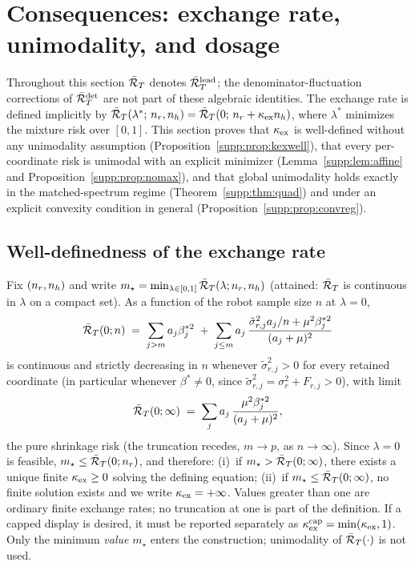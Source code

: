\section{Consequences: exchange rate, unimodality, and dosage}
\label{supp:t2}

Throughout this section $\bar{\mathcal{R}}_T$ denotes $\bar{\mathcal{R}}_T^{\mathrm{lead}}$; the denominator-fluctuation corrections of $\bar{\mathcal{R}}_T^{\det}$ are not part of these algebraic identities.
The exchange rate is defined implicitly by $\bar{\mathcal{R}}_T(\lambda^*;\, n_r, n_h) = \bar{\mathcal{R}}_T(0;\, n_r + \kappa_{\mathrm{ex}}n_h)$, where $\lambda^*$ minimizes the mixture risk over $[0,1]$.
This section proves that $\kappa_{\mathrm{ex}}$ is well-defined without any unimodality assumption (Proposition~\ref{supp:prop:kexwell}), that every per-coordinate risk is unimodal with an explicit minimizer (Lemma~\ref{supp:lem:affine} and Proposition~\ref{supp:prop:nomax}), and that global unimodality holds exactly in the matched-spectrum regime (Theorem~\ref{supp:thm:quad}) and under an explicit convexity condition in general (Proposition~\ref{supp:prop:convreg}).

\subsection{Well-definedness of the exchange rate}

\begin{proposition}\label{supp:prop:kexwell}
Fix $(n_r,n_h)$ and write $m_\star = \min_{\lambda \in [0,1]} \bar{\mathcal{R}}_T(\lambda; n_r, n_h)$ (attained: $\bar{\mathcal{R}}_T$ is continuous in $\lambda$ on a compact set).
As a function of the robot sample size $n$ at $\lambda = 0$,
\begin{equation}
\bar{\mathcal{R}}_T(0; n) \;=\; \sum_{j > m} a_j \beta_j^{*2} \;+\; \sum_{j \le m} a_j\, \frac{\tilde\sigma_{r,j}^2 a_j / n + \mu^2 \beta_j^{*2}}{(a_j + \mu)^2}
\end{equation}
is continuous and strictly decreasing in $n$ whenever $\tilde\sigma_{r,j}^2 > 0$ for every retained coordinate (in particular whenever $\beta^* \neq 0$, since $\tilde\sigma_{r,j}^2 = \sigma_r^2 + F_{r,j} > 0$), with limit
\begin{equation}
\bar{\mathcal{R}}_T(0; \infty) \;=\; \sum_{j} a_j\, \frac{\mu^2 \beta_j^{*2}}{(a_j + \mu)^2},
\end{equation}
the pure shrinkage risk (the truncation recedes, $m \to p$, as $n \to \infty$).
Since $\lambda = 0$ is feasible, $m_\star \le \bar{\mathcal{R}}_T(0; n_r)$, and therefore:
(i)~if $m_\star > \bar{\mathcal{R}}_T(0; \infty)$, there exists a unique finite $\kappa_{\mathrm{ex}} \ge 0$ solving the defining equation;
(ii)~if $m_\star \le \bar{\mathcal{R}}_T(0; \infty)$, no finite solution exists and we write $\kappa_{\mathrm{ex}} = +\infty$.
Values greater than one are ordinary finite exchange rates; no truncation at one is part of the definition.
If a capped display is desired, it must be reported separately as $\kappa_{\mathrm{ex}}^{\mathrm{cap}}=\min(\kappa_{\mathrm{ex}},1)$.
Only the minimum \emph{value} $m_\star$ enters the construction; unimodality of $\bar{\mathcal{R}}_T(\cdot)$ is not used.
\end{proposition}


